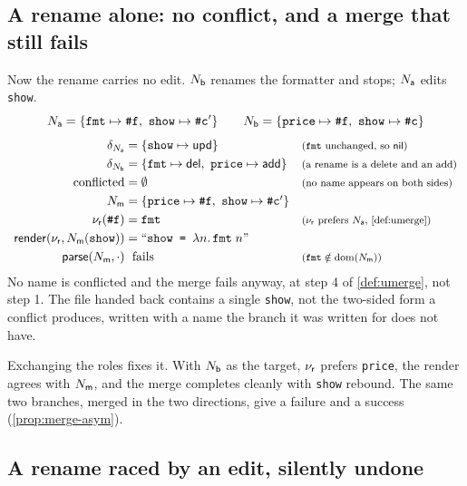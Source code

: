 \documentclass[11pt]{article}
\theoremstyle{definition}
\theoremstyle{plain}
\theoremstyle{remark}
\begin{document}
\subsection{A rename alone: no conflict, and a merge that still fails}\label{ex:merge-dangling}

Now the rename carries no edit. $N_{\mathsf{b}}$ renames the formatter and stops; $N_{\mathsf{a}}$ edits \texttt{show}.
\[
  \NA = \{\texttt{fmt} \mapsto \texttt{\#f},\ \texttt{show} \mapsto \texttt{\#c}'\}
  \qquad
  \NB = \{\texttt{price} \mapsto \texttt{\#f},\ \texttt{show} \mapsto \texttt{\#c}\}
\]
\[
\begin{array}{r@{\;}l@{\quad}l}
  \delta_{\NA} &= \{\texttt{show} \mapsto \dupd\}
    & \just{$\texttt{fmt}$ unchanged, so $\dnil$} \\[3pt]
  \delta_{\NB} &= \{\texttt{fmt} \mapsto \ddel,\ \texttt{price} \mapsto \dadd\}
    & \just{a rename is a delete and an add} \\[3pt]
  \text{conflicted} &= \emptyset
    & \just{no name appears on both sides} \\[3pt]
  \NM &= \{\texttt{price} \mapsto \texttt{\#f},\ \texttt{show} \mapsto \texttt{\#c}'\} & \\[3pt]
  \rnamer(\texttt{\#f}) &= \texttt{fmt}
    & \just{$\rnamer$ prefers $\NA$, \cref{def:umerge}} \\[3pt]
  \render(\rnamer, \NM(\texttt{show})) &= ``\texttt{show = }\ulam{n}{\uapp{\uvar{\texttt{fmt}}}{\uvar n}}\text{''} & \\[3pt]
  \uparse(\NM, \cdot) &\text{ fails}
    & \just{$\texttt{fmt} \notin \dom(\NM)$}
\end{array}
\]
No name is conflicted and the merge fails anyway, at step 4 of \cref{def:umerge}, not step 1. The
file handed back contains a single \texttt{show}, not the two-sided form a conflict produces, written
with a name the branch it was written for does not have.

Exchanging the roles fixes it. With $N_{\mathsf{b}}$ as the target, $\nu_{\mathsf{r}}$ prefers \texttt{price}, the render
agrees with $N_{\mathsf{m}}$, and the merge completes cleanly with \texttt{show} rebound. The same two branches,
merged in the two directions, give a failure and a success (\cref{prop:merge-asym}).

\subsection{A rename raced by an edit, silently undone}\label{ex:merge-dup}
\end{document}

